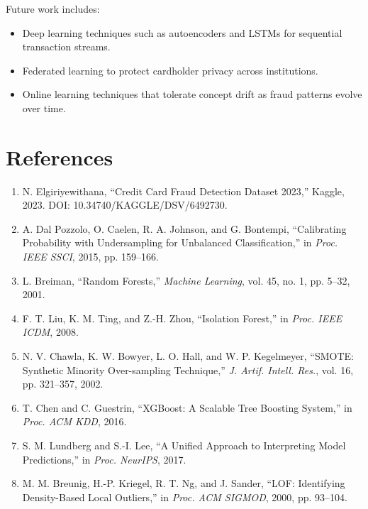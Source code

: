 \documentclass[conference]{IEEEtran}
\begin{document}
Future work includes:
\begin{itemize}
  \item Deep learning techniques such as autoencoders and LSTMs for sequential transaction streams.
  \item Federated learning to protect cardholder privacy across institutions.
  \item Online learning techniques that tolerate concept drift as fraud patterns evolve over time.
\end{itemize}

\section*{References}

\begin{enumerate}
  \item N. Elgiriyewithana, ``Credit Card Fraud Detection Dataset 2023,'' Kaggle, 2023. DOI: 10.34740/KAGGLE/DSV/6492730.
  \item A. Dal Pozzolo, O. Caelen, R. A. Johnson, and G. Bontempi, ``Calibrating Probability with Undersampling for Unbalanced Classification,'' in \textit{Proc. IEEE SSCI}, 2015, pp. 159--166.
  \item L. Breiman, ``Random Forests,'' \textit{Machine Learning}, vol. 45, no. 1, pp. 5--32, 2001.
  \item F. T. Liu, K. M. Ting, and Z.-H. Zhou, ``Isolation Forest,'' in \textit{Proc. IEEE ICDM}, 2008.
  \item N. V. Chawla, K. W. Bowyer, L. O. Hall, and W. P. Kegelmeyer, ``SMOTE: Synthetic Minority Over-sampling Technique,'' \textit{J. Artif. Intell. Res.}, vol. 16, pp. 321--357, 2002.
  \item T. Chen and C. Guestrin, ``XGBoost: A Scalable Tree Boosting System,'' in \textit{Proc. ACM KDD}, 2016.
  \item S. M. Lundberg and S.-I. Lee, ``A Unified Approach to Interpreting Model Predictions,'' in \textit{Proc. NeurIPS}, 2017.
  \item M. M. Breunig, H.-P. Kriegel, R. T. Ng, and J. Sander, ``LOF: Identifying Density-Based Local Outliers,'' in \textit{Proc. ACM SIGMOD}, 2000, pp. 93--104.
\end{enumerate}
\end{document}

